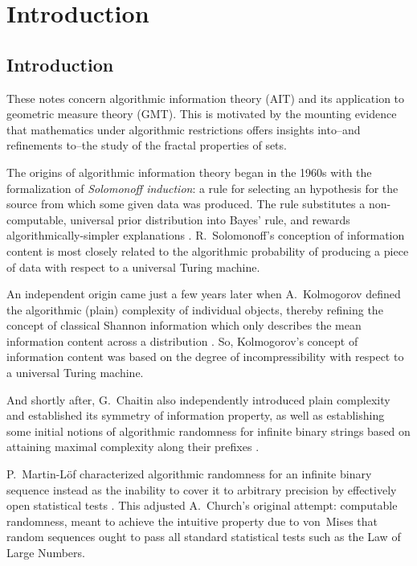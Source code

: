 \chapter{Introduction} \label{chapter1:introduction}

\section{Introduction} \label{section:Introduction}

These notes concern algorithmic information theory (AIT) and its application to geometric measure theory (GMT). This is motivated by the mounting evidence that mathematics under algorithmic restrictions offers insights into--and refinements to--the study of the fractal properties of sets. 

The origins of algorithmic information theory began in the 1960s with the formalization of \textit{Solomonoff induction}: a rule for selecting an hypothesis for the source from which some given data was produced. The rule substitutes a non-computable, universal prior distribution into Bayes' rule, and rewards algorithmically-simpler explanations \cite{Sol60}. R.~Solomonoff's conception of information content is most closely related to the algorithmic probability of producing a piece of data with respect to a universal Turing machine. 

An independent origin came just a few years later when A.~Kolmogorov defined the algorithmic (plain) complexity of individual objects, thereby refining the concept of classical Shannon information which only describes the mean information content across a distribution \cite{Kol68, Kol68b}. So, Kolmogorov's concept of information content was based on the degree of incompressibility with respect to a universal Turing machine. 

And shortly after, G.~Chaitin also independently introduced plain complexity and established its symmetry of information property, as well as establishing some initial notions of algorithmic randomness for infinite binary strings based on attaining maximal complexity along their prefixes \cite{Cha66}. 

P.~Martin-L{\"o}f characterized algorithmic randomness for an infinite binary sequence instead as the inability to cover it to arbitrary precision by effectively open statistical tests \cite{Mar66}. This adjusted A.~Church's original attempt: computable randomness, meant to achieve the intuitive property due to von~Mises that random sequences ought to pass all standard statistical tests such as the Law of Large Numbers. 


